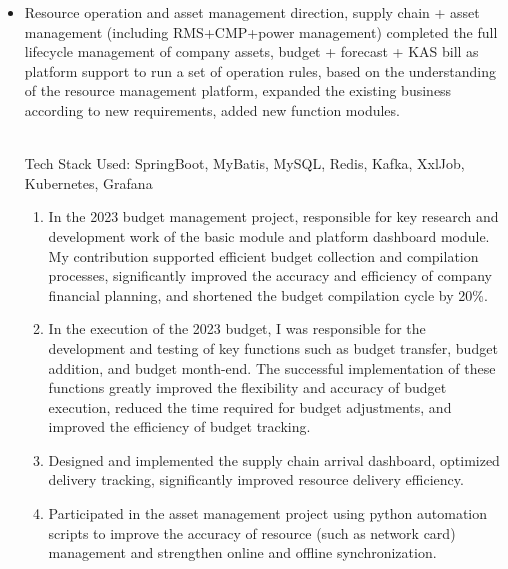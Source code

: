 \documentclass{resume}
\newcommand{\en}[1]{#1}
\newcommand{\zh}[1]{}
\begin{document}
\begin{itemize}
      \item \en{Resource operation and asset management direction, supply chain + asset management (including RMS+CMP+power management) completed the full lifecycle management of company assets, budget + forecast + KAS bill as platform support to run a set of operation rules, based on the understanding of the resource management platform, expanded the existing business according to new requirements, added new function modules.}
            \zh{资源运营和资产管理方向，供应链+资产管理（包括RMS+CMP+电力管理）完成了公司资产的全生命周期管理，预算+预测+KAS账单作为平台支撑运行一套运营规则，在理解资源管理平台的基础上，根据新的需求在现有的业务上进行扩展，增添新的功能模块}
            \en{\\Tech Stack Used: SpringBoot, MyBatis, MySQL, Redis, Kafka, XxlJob, Kubernetes, Grafana}
            \zh{\\使用的技术栈: SpringBoot, MyBatis, MySQL, Redis, Kafka, XxlJob, Kubernetes, Grafana}
            \begin{enumerate}
                  \item \en{In the 2023 budget management project, responsible for key research and development work of the basic module and platform dashboard module. My contribution supported efficient budget collection and compilation processes, significantly improved the accuracy and efficiency of company financial planning, and shortened the budget compilation cycle by 20\%.}
                        \zh{在2023年预算管理项目中，负责基础模块和平台大盘模块的关键研发工作。我的贡献支持了高效的预算收集与编制流程，显著提高公司财务规划的精确度和效率，缩短预算编制周期20\%。}
                  \item  \en{In the execution of the 2023 budget, I was responsible for the development and testing of key functions such as budget transfer, budget addition, and budget month-end. The successful implementation of these functions greatly improved the flexibility and accuracy of budget execution, reduced the time required for budget adjustments, and improved the efficiency of budget tracking.}
                        \zh{在2023年度预算执行中，我负责开发和测试预算转移、预算追加及预算月结等关键功能。这些功能的成功实施极大提高了预算执行的灵活性和精确度，减少了预算调整所需的时间，提升了预算追踪的效率}
                  \item \en{Designed and implemented the supply chain arrival dashboard, optimized delivery tracking, significantly improved resource delivery efficiency.}
                        \zh{设计实现供应链到货大盘，优化交付追踪，显著提升资源交付效率}
                  \item \en{Participated in the asset management project using python automation scripts to improve the accuracy of resource (such as network card) management and strengthen online and offline synchronization.}
                        \zh{参与资产治理项目中使用python自动化脚本提升资源（如网卡）管理准确性，强化线上线下同步}\\
            \end{enumerate}

\end{itemize}
\end{document}
